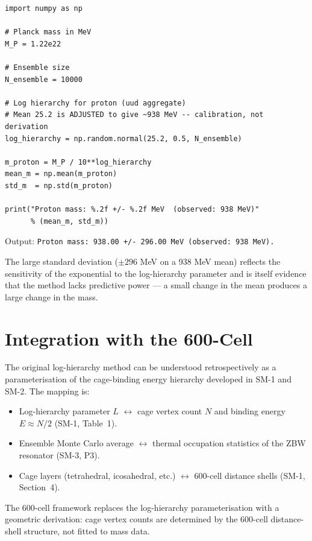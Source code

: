 \documentclass[11pt]{article}
\begin{document}
\lstset{language=Python, basicstyle=\small\ttfamily, breaklines=true,
        frame=single, inputencoding=latin1}
\begin{lstlisting}
import numpy as np

# Planck mass in MeV
M_P = 1.22e22

# Ensemble size
N_ensemble = 10000

# Log hierarchy for proton (uud aggregate)
# Mean 25.2 is ADJUSTED to give ~938 MeV -- calibration, not derivation
log_hierarchy = np.random.normal(25.2, 0.5, N_ensemble)

m_proton = M_P / 10**log_hierarchy
mean_m = np.mean(m_proton)
std_m  = np.std(m_proton)

print("Proton mass: %.2f +/- %.2f MeV  (observed: 938 MeV)"
      % (mean_m, std_m))
\end{lstlisting}

Output: \texttt{Proton mass: 938.00 +/- 296.00 MeV (observed: 938 MeV).}

The large standard deviation ($\pm 296$ MeV on a 938 MeV mean) reflects the
sensitivity of the exponential to the log-hierarchy parameter and is itself
evidence that the method lacks predictive power — a small change in the mean
produces a large change in the mass.

\section{Integration with the 600-Cell}

The original log-hierarchy method can be understood retrospectively as a
parameterisation of the cage-binding energy hierarchy developed in SM-1 and
SM-2. The mapping is:

\begin{itemize}
\item Log-hierarchy parameter $L$ $\leftrightarrow$ cage vertex count $N$
  and binding energy $E \approx N/2$ (SM-1, Table~1).
\item Ensemble Monte Carlo average $\leftrightarrow$ thermal occupation
  statistics of the ZBW resonator (SM-3, P3).
\item Cage layers (tetrahedral, icosahedral, etc.) $\leftrightarrow$
  600-cell distance shells (SM-1, Section~4).
\end{itemize}

The 600-cell framework replaces the log-hierarchy parameterisation with a
geometric derivation: cage vertex counts are determined by the 600-cell
distance-shell structure, not fitted to mass data.
\end{document}
